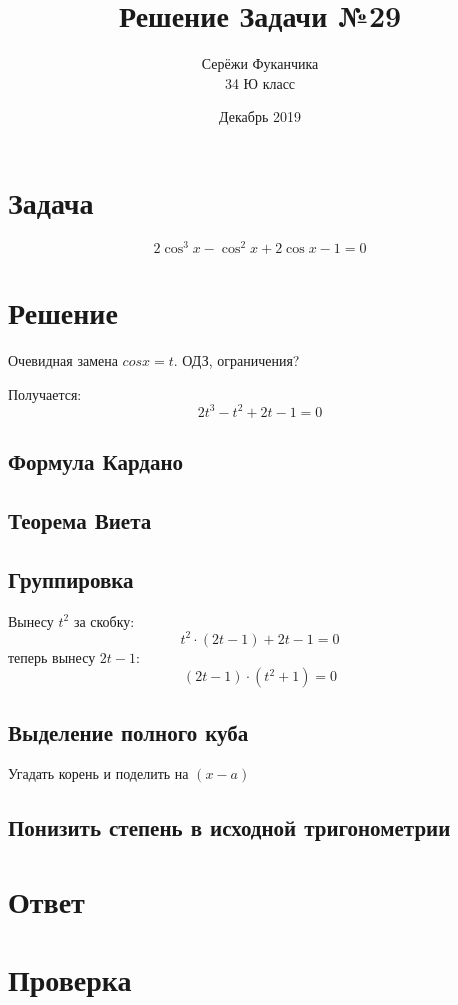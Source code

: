 \documentclass{article}
\title{Решение Задачи №29}
\author{Серёжи Фуканчика\\34 Ю класс}
\date{Декабрь 2019}
\begin{document}
\maketitle

\section{Задача}
\begin{equation}
2\cos^3{x}-\cos^2{x}+2\cos{x}-1=0
\end{equation}

\section{Решение}
Очевидная замена $cos{x}=t$. ОДЗ, ограничения?

Получается:
$$2t^3-t^2+2t-1=0$$

\subsection{Формула Кардано}

\subsection{Теорема Виета}

\subsection{Группировка}
Вынесу $t^2$ за скобку:
$$t^2\cdot{}(2t-1)+2t-1=0$$
теперь вынесу $2t-1$:
$$(2t-1)\cdot{}(t^2+1)=0$$


\subsection{Выделение полного куба}

Угадать корень и поделить на $(x-a)$

\subsection{Понизить степень в исходной тригонометрии}

\section{Ответ}

\section{Проверка}
\end{document}

